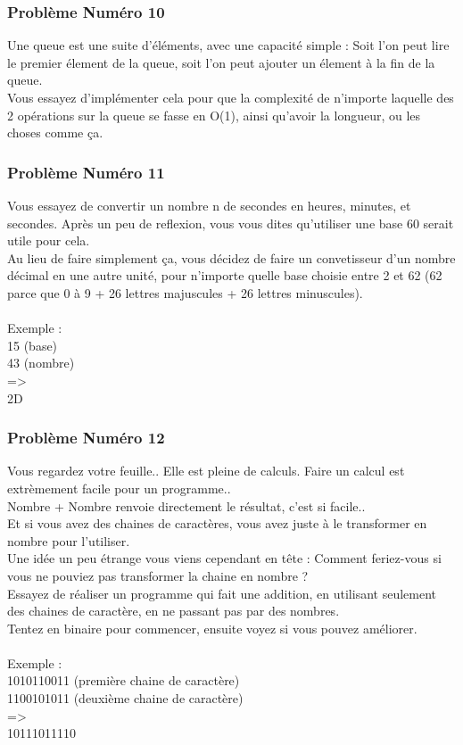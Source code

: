 \documentclass[12pt]{article}
\begin{document}
\subsubsection{Problème Numéro 10}
Une queue est une suite d'éléments, avec une capacité simple : Soit l'on peut lire le premier élement de la queue, soit l'on peut ajouter un élement à la fin de la queue.\\
Vous essayez d'implémenter cela pour que la complexité de n'importe laquelle des 2 opérations sur la queue se fasse en O(1), ainsi qu'avoir la longueur, ou les choses comme ça.

\subsubsection{Problème Numéro 11}

Vous essayez de convertir un nombre n de secondes en heures, minutes, et secondes. Après un peu de reflexion, vous vous dites qu'utiliser une base 60 serait utile pour cela.\\
Au lieu de faire simplement ça, vous décidez de faire un convetisseur d'un nombre décimal en une autre unité, pour n'importe quelle base choisie entre 2 et 62 (62 parce que 0 à 9 + 26 lettres majuscules + 26 lettres minuscules).
\\\\
Exemple :\\
15 (base)\\
43 (nombre)\\
=\textgreater\\
2D

\subsubsection{Problème Numéro 12}

Vous regardez votre feuille.. Elle est pleine de calculs. Faire un calcul est extrèmement facile pour un programme..\\
Nombre + Nombre renvoie directement le résultat, c'est si facile..\\
Et si vous avez des chaines de caractères, vous avez juste à le transformer en nombre pour l'utiliser.\\
Une idée un peu étrange vous viens cependant en tête : Comment feriez-vous si vous ne pouviez pas transformer la chaine en nombre ?\\
Essayez de réaliser un programme qui fait une addition, en utilisant seulement des chaines de caractère, en ne passant pas par des nombres.\\
Tentez en binaire pour commencer, ensuite voyez si vous pouvez améliorer.
\\\\
Exemple :\\
1010110011 (première chaine de caractère)\\
1100101011 (deuxième chaine de caractère)\\
=\textgreater\\
10111011110
\end{document}
